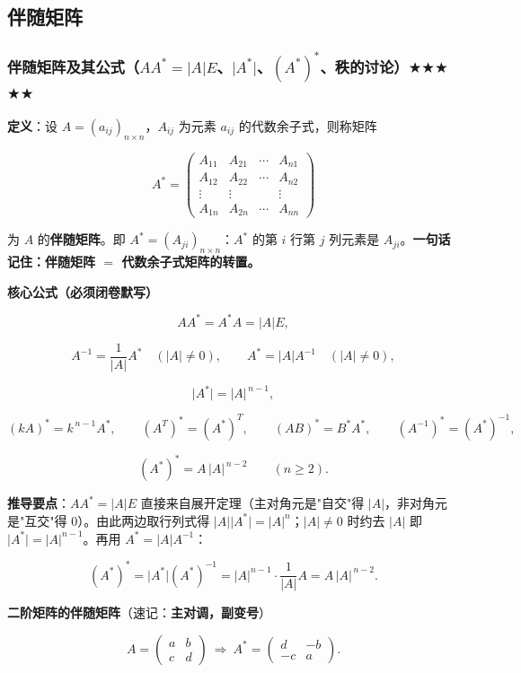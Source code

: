 \documentclass[11pt,openany,UTF8]{ctexbook}
\begin{document}
\subsection{伴随矩阵}

\subsubsection{伴随矩阵及其公式（$AA^*=\vert A\vert E$、$\vert A^*\vert$、$(A^*)^*$、秩的讨论）$\bigstar$$\bigstar$$\bigstar$$\bigstar$$\bigstar$}

\textbf{定义}：设 $A=(a_{ij})_{n\times n}$，$A_{ij}$ 为元素 $a_{ij}$ 的代数余子式，则称矩阵

\[A^*=\begin{pmatrix}A_{11}&A_{21}&\cdots&A_{n1}\\A_{12}&A_{22}&\cdots&A_{n2}\\\vdots&\vdots&&\vdots\\A_{1n}&A_{2n}&\cdots&A_{nn}\end{pmatrix}\]

为 $A$ 的\textbf{伴随矩阵}。即 $A^*=(A_{ji})_{n\times n}$：$A^*$ 的第 $i$ 行第 $j$ 列元素是 $A_{ji}$。\textbf{一句话记住：伴随矩阵 $=$ 代数余子式矩阵的转置。}

\textbf{核心公式（必须闭卷默写）}

\[AA^*=A^*A=\vert A\vert E,\]

\[A^{-1}=\frac{1}{\vert A\vert}A^*\quad(\vert A\vert\ne0),\qquad A^*=\vert A\vert A^{-1}\quad(\vert A\vert\ne0),\]

\[\vert A^*\vert=\vert A\vert^{\,n-1},\]

\[(kA)^*=k^{\,n-1}A^*,\qquad (A^T)^*=(A^*)^T,\qquad (AB)^*=B^*A^*,\qquad (A^{-1})^*=(A^*)^{-1},\]

\[(A^*)^*=A\,\vert A\vert^{\,n-2}\qquad(n\ge2).\]

\textbf{推导要点}：$AA^*=\vert A\vert E$ 直接来自展开定理（主对角元是"自交"得 $\vert A\vert$，非对角元是"互交"得 $0$）。由此两边取行列式得 $\vert A\vert\vert A^*\vert=\vert A\vert^n$；$\vert A\vert\ne0$ 时约去 $\vert A\vert$ 即 $\vert A^*\vert=\vert A\vert^{n-1}$。再用 $A^*=\vert A\vert A^{-1}$：

\[(A^*)^*=\vert A^*\vert(A^*)^{-1}=\vert A\vert^{n-1}\cdot\frac{1}{\vert A\vert}A=A\,\vert A\vert^{\,n-2}.\]

\textbf{二阶矩阵的伴随矩阵}（速记：\textbf{主对调，副变号}）

\[A=\begin{pmatrix}a&b\\c&d\end{pmatrix}\ \Longrightarrow\ A^*=\begin{pmatrix}d&-b\\-c&a\end{pmatrix}.\]
\end{document}
